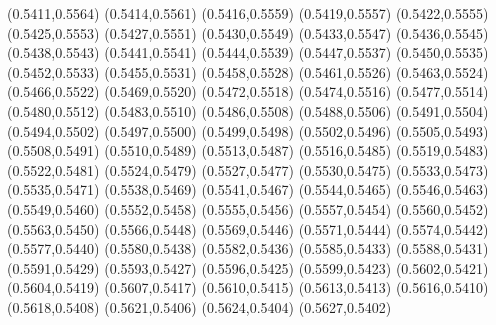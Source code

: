 \PST@Filltriangle(0.5411,0.5564)
\PST@Filltriangle(0.5414,0.5561)
\PST@Filltriangle(0.5416,0.5559)
\PST@Filltriangle(0.5419,0.5557)
\PST@Filltriangle(0.5422,0.5555)
\PST@Filltriangle(0.5425,0.5553)
\PST@Filltriangle(0.5427,0.5551)
\PST@Filltriangle(0.5430,0.5549)
\PST@Filltriangle(0.5433,0.5547)
\PST@Filltriangle(0.5436,0.5545)
\PST@Filltriangle(0.5438,0.5543)
\PST@Filltriangle(0.5441,0.5541)
\PST@Filltriangle(0.5444,0.5539)
\PST@Filltriangle(0.5447,0.5537)
\PST@Filltriangle(0.5450,0.5535)
\PST@Filltriangle(0.5452,0.5533)
\PST@Filltriangle(0.5455,0.5531)
\PST@Filltriangle(0.5458,0.5528)
\PST@Filltriangle(0.5461,0.5526)
\PST@Filltriangle(0.5463,0.5524)
\PST@Filltriangle(0.5466,0.5522)
\PST@Filltriangle(0.5469,0.5520)
\PST@Filltriangle(0.5472,0.5518)
\PST@Filltriangle(0.5474,0.5516)
\PST@Filltriangle(0.5477,0.5514)
\PST@Filltriangle(0.5480,0.5512)
\PST@Filltriangle(0.5483,0.5510)
\PST@Filltriangle(0.5486,0.5508)
\PST@Filltriangle(0.5488,0.5506)
\PST@Filltriangle(0.5491,0.5504)
\PST@Filltriangle(0.5494,0.5502)
\PST@Filltriangle(0.5497,0.5500)
\PST@Filltriangle(0.5499,0.5498)
\PST@Filltriangle(0.5502,0.5496)
\PST@Filltriangle(0.5505,0.5493)
\PST@Filltriangle(0.5508,0.5491)
\PST@Filltriangle(0.5510,0.5489)
\PST@Filltriangle(0.5513,0.5487)
\PST@Filltriangle(0.5516,0.5485)
\PST@Filltriangle(0.5519,0.5483)
\PST@Filltriangle(0.5522,0.5481)
\PST@Filltriangle(0.5524,0.5479)
\PST@Filltriangle(0.5527,0.5477)
\PST@Filltriangle(0.5530,0.5475)
\PST@Filltriangle(0.5533,0.5473)
\PST@Filltriangle(0.5535,0.5471)
\PST@Filltriangle(0.5538,0.5469)
\PST@Filltriangle(0.5541,0.5467)
\PST@Filltriangle(0.5544,0.5465)
\PST@Filltriangle(0.5546,0.5463)
\PST@Filltriangle(0.5549,0.5460)
\PST@Filltriangle(0.5552,0.5458)
\PST@Filltriangle(0.5555,0.5456)
\PST@Filltriangle(0.5557,0.5454)
\PST@Filltriangle(0.5560,0.5452)
\PST@Filltriangle(0.5563,0.5450)
\PST@Filltriangle(0.5566,0.5448)
\PST@Filltriangle(0.5569,0.5446)
\PST@Filltriangle(0.5571,0.5444)
\PST@Filltriangle(0.5574,0.5442)
\PST@Filltriangle(0.5577,0.5440)
\PST@Filltriangle(0.5580,0.5438)
\PST@Filltriangle(0.5582,0.5436)
\PST@Filltriangle(0.5585,0.5433)
\PST@Filltriangle(0.5588,0.5431)
\PST@Filltriangle(0.5591,0.5429)
\PST@Filltriangle(0.5593,0.5427)
\PST@Filltriangle(0.5596,0.5425)
\PST@Filltriangle(0.5599,0.5423)
\PST@Filltriangle(0.5602,0.5421)
\PST@Filltriangle(0.5604,0.5419)
\PST@Filltriangle(0.5607,0.5417)
\PST@Filltriangle(0.5610,0.5415)
\PST@Filltriangle(0.5613,0.5413)
\PST@Filltriangle(0.5616,0.5410)
\PST@Filltriangle(0.5618,0.5408)
\PST@Filltriangle(0.5621,0.5406)
\PST@Filltriangle(0.5624,0.5404)
\PST@Filltriangle(0.5627,0.5402)
